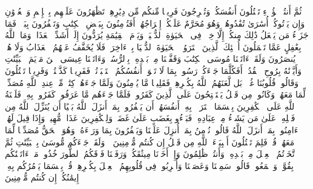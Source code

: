 \stopbuffer%
\startbuffer[\q:2:85]
ثُمَّ أَنتُمۡ هَٰۤؤُلَاۤءِ تَقۡتُلُونَ أَنفُسَكُمۡ وَتُخۡرِجُونَ فَرِیقࣰا مِّنكُم مِّن دِیَٰرِهِمۡ تَظَٰهَرُونَ عَلَیۡهِم بِٱلۡإِثۡمِ وَٱلۡعُدۡوَٰنِ وَإِن یَأۡتُوكُمۡ أُسَٰرَىٰ تُفَٰدُوهُمۡ وَهُوَ مُحَرَّمٌ عَلَیۡكُمۡ إِخۡرَاجُهُمۡۚ أَفَتُؤۡمِنُونَ بِبَعۡضِ ٱلۡكِتَٰبِ وَتَكۡفُرُونَ بِبَعۡضࣲۚ فَمَا جَزَاۤءُ مَن یَفۡعَلُ ذَٰلِكَ مِنكُمۡ إِلَّا خِزۡیࣱ فِی ٱلۡحَیَوٰةِ ٱلدُّنۡیَاۖ وَیَوۡمَ ٱلۡقِیَٰمَةِ یُرَدُّونَ إِلَىٰۤ أَشَدِّ ٱلۡعَذَابِۗ وَمَا ٱللَّهُ بِغَٰفِلٍ عَمَّا تَعۡمَلُونَ%
\stopbuffer%
\startbuffer[\q:2:86]
أُو۟لَٰۤئِكَ ٱلَّذِینَ ٱشۡتَرَوُا۟ ٱلۡحَیَوٰةَ ٱلدُّنۡیَا بِٱلۡءَاخِرَةِۖ فَلَا یُخَفَّفُ عَنۡهُمُ ٱلۡعَذَابُ وَلَا هُمۡ یُنصَرُونَ%
\stopbuffer%
\startbuffer[\q:2:87]
وَلَقَدۡ ءَاتَیۡنَا مُوسَى ٱلۡكِتَٰبَ وَقَفَّیۡنَا مِنۢ بَعۡدِهِۦ بِٱلرُّسُلِۖ وَءَاتَیۡنَا عِیسَى ٱبۡنَ مَرۡیَمَ ٱلۡبَیِّنَٰتِ وَأَیَّدۡنَٰهُ بِرُوحِ ٱلۡقُدُسِۗ أَفَكُلَّمَا جَاۤءَكُمۡ رَسُولُۢ بِمَا لَا تَهۡوَىٰۤ أَنفُسُكُمُ ٱسۡتَكۡبَرۡتُمۡ فَفَرِیقࣰا كَذَّبۡتُمۡ وَفَرِیقࣰا تَقۡتُلُونَ%
\stopbuffer%
\startbuffer[\q:2:88]
وَقَالُوا۟ قُلُوبُنَا غُلۡفُۢۚ بَل لَّعَنَهُمُ ٱللَّهُ بِكُفۡرِهِمۡ فَقَلِیلࣰا مَّا یُؤۡمِنُونَ%
\stopbuffer%
\startbuffer[\q:2:89]
وَلَمَّا جَاۤءَهُمۡ كِتَٰبࣱ مِّنۡ عِندِ ٱللَّهِ مُصَدِّقࣱ لِّمَا مَعَهُمۡ وَكَانُوا۟ مِن قَبۡلُ یَسۡتَفۡتِحُونَ عَلَى ٱلَّذِینَ كَفَرُوا۟ فَلَمَّا جَاۤءَهُم مَّا عَرَفُوا۟ كَفَرُوا۟ بِهِۦۚ فَلَعۡنَةُ ٱللَّهِ عَلَى ٱلۡكَٰفِرِینَ%
\stopbuffer%
\startbuffer[\q:2:90]
بِئۡسَمَا ٱشۡتَرَوۡا۟ بِهِۦۤ أَنفُسَهُمۡ أَن یَكۡفُرُوا۟ بِمَاۤ أَنزَلَ ٱللَّهُ بَغۡیًا أَن یُنَزِّلَ ٱللَّهُ مِن فَضۡلِهِۦ عَلَىٰ مَن یَشَاۤءُ مِنۡ عِبَادِهِۦۖ فَبَاۤءُو بِغَضَبٍ عَلَىٰ غَضَبࣲۚ وَلِلۡكَٰفِرِینَ عَذَابࣱ مُّهِینࣱ%
\stopbuffer%
\startbuffer[\q:2:91]
وَإِذَا قِیلَ لَهُمۡ ءَامِنُوا۟ بِمَاۤ أَنزَلَ ٱللَّهُ قَالُوا۟ نُؤۡمِنُ بِمَاۤ أُنزِلَ عَلَیۡنَا وَیَكۡفُرُونَ بِمَا وَرَاۤءَهُۥ وَهُوَ ٱلۡحَقُّ مُصَدِّقࣰا لِّمَا مَعَهُمۡۗ قُلۡ فَلِمَ تَقۡتُلُونَ أَنۢبِیَاۤءَ ٱللَّهِ مِن قَبۡلُ إِن كُنتُم مُّؤۡمِنِینَ%
\stopbuffer%
\startbuffer[\q:2:92]
۞ وَلَقَدۡ جَاۤءَكُم مُّوسَىٰ بِٱلۡبَیِّنَٰتِ ثُمَّ ٱتَّخَذۡتُمُ ٱلۡعِجۡلَ مِنۢ بَعۡدِهِۦ وَأَنتُمۡ ظَٰلِمُونَ%
\stopbuffer%
\startbuffer[\q:2:93]
وَإِذۡ أَخَذۡنَا مِیثَٰقَكُمۡ وَرَفَعۡنَا فَوۡقَكُمُ ٱلطُّورَ خُذُوا۟ مَاۤ ءَاتَیۡنَٰكُم بِقُوَّةࣲ وَٱسۡمَعُوا۟ۖ قَالُوا۟ سَمِعۡنَا وَعَصَیۡنَا وَأُشۡرِبُوا۟ فِی قُلُوبِهِمُ ٱلۡعِجۡلَ بِكُفۡرِهِمۡۚ قُلۡ بِئۡسَمَا یَأۡمُرُكُم بِهِۦۤ إِیمَٰنُكُمۡ إِن كُنتُم مُّؤۡمِنِینَ%
\stopbuffer%
